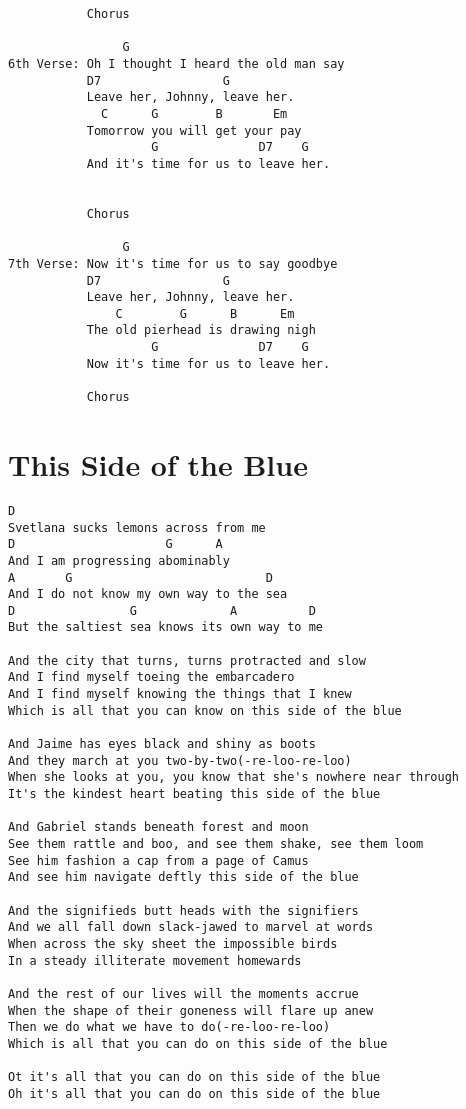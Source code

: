 \documentclass[leqno]{memoir}
\begin{document}
\begin{verbatim}
           Chorus

                G
6th Verse: Oh I thought I heard the old man say
           D7                 G
           Leave her, Johnny, leave her.
             C      G        B       Em
           Tomorrow you will get your pay
                    G              D7    G
           And it's time for us to leave her.


           Chorus

                G
7th Verse: Now it's time for us to say goodbye
           D7                 G
           Leave her, Johnny, leave her.
               C        G      B      Em
           The old pierhead is drawing nigh
                    G              D7    G
           Now it's time for us to leave her.

           Chorus
\end{verbatim}
\newpage



\chapter{This Side of the Blue}
\begin{verbatim}
D
Svetlana sucks lemons across from me
D                     G      A
And I am progressing abominably	
A		G	                        D
And I do not know my own way to the sea
D                G             A          D
But the saltiest sea knows its own way to me

And the city that turns, turns protracted and slow
And I find myself toeing the embarcadero
And I find myself knowing the things that I knew
Which is all that you can know on this side of the blue

And Jaime has eyes black and shiny as boots
And they march at you two-by-two(-re-loo-re-loo)
When she looks at you, you know that she's nowhere near through
It's the kindest heart beating this side of the blue

And Gabriel stands beneath forest and moon
See them rattle and boo, and see them shake, see them loom
See him fashion a cap from a page of Camus
And see him navigate deftly this side of the blue

And the signifieds butt heads with the signifiers
And we all fall down slack-jawed to marvel at words
When across the sky sheet the impossible birds
In a steady illiterate movement homewards

And the rest of our lives will the moments accrue
When the shape of their goneness will flare up anew
Then we do what we have to do(-re-loo-re-loo)
Which is all that you can do on this side of the blue

Ot it's all that you can do on this side of the blue
Oh it's all that you can do on this side of the blue
\end{verbatim}
\newpage
\end{document}
